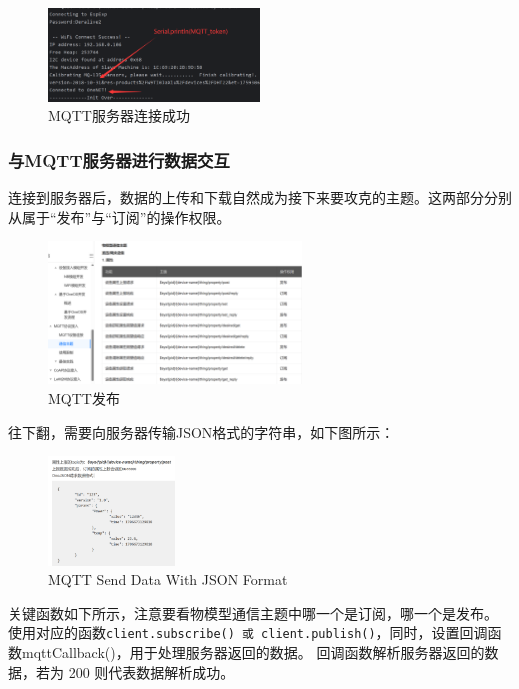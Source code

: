\begin{figure} [H]
    \centering
    \includegraphics[width=0.5\textwidth]{img/MQTTConnected.png}
    \caption{MQTT服务器连接成功}
\end{figure}

\subsubsection{与MQTT服务器进行数据交互}

连接到服务器后，数据的上传和下载自然成为接下来要攻克的主题。这两部分分别从属于“发布”与“订阅”的操作权限。

\begin{figure} [H]
    \centering
    \includegraphics[width=0.6\textwidth]{img/MQTTSubscribe.png}
    \caption{MQTT发布}
\end{figure}

往下翻，需要向服务器传输JSON格式的字符串，如下图所示：

\begin{figure} [H]
    \centering
    \includegraphics[width=0.3\textwidth]{img/MQTTSendJson.png}
    \caption{MQTT Send Data With JSON Format}
\end{figure}

关键函数如下所示，注意要看物模型通信主题中哪一个是订阅，哪一个是发布。
使用对应的函数\texttt{client.subscribe() 或 client.publish()}，同时，设置回调函数mqttCallback()，用于处理服务器返回的数据。
回调函数解析服务器返回的数据，若为 200 则代表数据解析成功。


